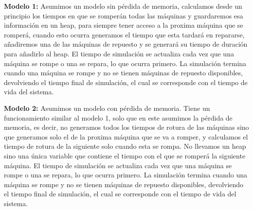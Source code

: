 \documentclass[11pt]{article}
\begin{document}
    \noindent \textbf{Modelo 1:} Asumimos un modelo sin pérdida de memoria, calculamos desde un principio los tiempos en que 
    se romperán todas las máquinas y guardaremos esa información en un heap, para siempre tener acceso a la proxima 
    máquina que se romperá, cuando esto ocurra generamos el tiempo que esta tardará en repararse, añadiremos 
    una de las máquinas de repuesto y se generará su tiempo de duración para añadirlo al heap. El tiempo de 
    simulación se actualiza cada vez que una máquina se rompe o una se repara, lo que ocurra primero. La simulación 
    termina cuando una máquina se rompe y no se tienen máquinas de repuesto disponibles, devolviendo el tiempo 
    final de simulación, el cual se corresponde con el tiempo de vida del sistema. \vspace{5mm}

    \noindent \textbf{Modelo 2:} Asumimos un modelo con pérdida de memoria. Tiene un funcionamiento similar al modelo 1, 
    solo que en este asumimos la pérdida de memoria, es decir, no generamos todos los tiempos de rotura de las 
    máquinas sino que generamos solo el de la proxima máquina que se va a romper, y calculamos el tiempo de rotura 
    de la siguiente solo cuando esta se rompa. No llevamos un heap sino una única variable que contiene el tiempo 
    con el que se romperá la siguiente máquina. El tiempo de simulación se actualiza cada vez que una máquina se 
    rompe o una se repara, lo que ocurra primero. La simulación termina cuando una máquina se rompe y no se tienen 
    máquinas de repuesto disponibles, devolviendo el tiempo final de simulación, el cual se corresponde con el tiempo 
    de vida del sistema. 
\end{document}
